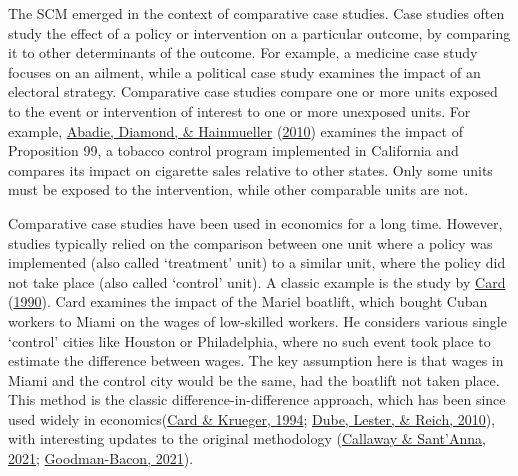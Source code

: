 \documentclass[12pt,nobind, a4paper]{reedthesis}
\begin{document}
 The SCM emerged in the context of comparative case studies. Case studies often study the effect of a policy or intervention on a particular outcome, by comparing it to other determinants of the outcome. For example, a medicine case study focuses on an ailment, while a political case study examines the impact of an electoral strategy. Comparative case studies compare one or more units exposed to the event or intervention of interest to one or more unexposed units. For example, \protect\hyperlink{ref-abadie_synthetic_2010}{Abadie, Diamond, \& Hainmueller} (\protect\hyperlink{ref-abadie_synthetic_2010}{2010}) examines the impact of Proposition 99, a tobacco control program implemented in California and compares its impact on cigarette sales relative to other states. Only some units must be exposed to the intervention, while other comparable units are not.
 \linebreak

 Comparative case studies have been used in economics for a long time. However, studies typically relied on the comparison between one unit where a policy was implemented (also called `treatment' unit) to a similar unit, where the policy did not take place (also called `control' unit). A classic example is the study by \protect\hyperlink{ref-card_impact_1990}{Card} (\protect\hyperlink{ref-card_impact_1990}{1990}). Card examines the impact of the Mariel boatlift, which bought Cuban workers to Miami on the wages of low-skilled workers. He considers various single `control' cities like Houston or Philadelphia, where no such event took place to estimate the difference between wages. The key assumption here is that wages in Miami and the control city would be the same, had the boatlift not taken place. This method is the classic difference-in-difference approach, which has been since used widely in economics(\protect\hyperlink{ref-card_minimum_1994}{Card \& Krueger, 1994}; \protect\hyperlink{ref-dube_minimum_2010}{Dube, Lester, \& Reich, 2010}), with interesting updates to the original methodology (\protect\hyperlink{ref-callaway_difference_differences_2021}{Callaway \& Sant'Anna, 2021}; \protect\hyperlink{ref-goodman-bacon_difference_differences_2021}{Goodman-Bacon, 2021}).
 \linebreak
\end{document}
